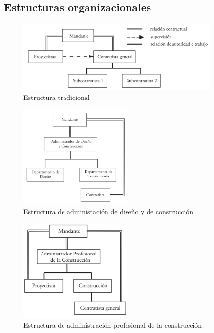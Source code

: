 \documentclass{article} %
\begin{document}
\subsection{Estructuras organizacionales}

\begin{figure}[h!]
    \centering
    \includegraphics[width=0.9\textwidth]{trad_rel.png}
    \caption{Estructura tradicional}
    \label{fig:estructuras_organizacionale}
\end{figure}

\begin{figure}[h!]
    \centering
    \includegraphics[width=0.5\textwidth]{ad_dis_rel.png}
    \caption{Estructura de administación de diseño y de construcción}
    \label{fig:estructuras_organizacional}
\end{figure}

\begin{figure}[h!]
    \centering
    \includegraphics[width=0.5\textwidth]{sd_prof_rel.png}
    \caption{Estructura de administración profesional de la construcción}
    \label{fig:estructuras_organizacionales}
\end{figure}
\end{document}
